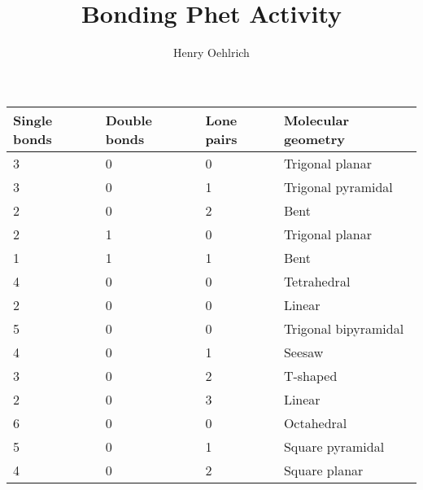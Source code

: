 \documentclass{article}
\title{Bonding Phet Activity}
\author{Henry Oehlrich}
\begin{document}
\maketitle

\begin{tabular}{l|l|l|l}
    \toprule
    Single bonds & Double bonds & Lone pairs & Molecular geometry \\
    \midrule
    3 & 0 & 0 & Trigonal planar \\
    3 & 0 & 1 & Trigonal pyramidal \\
    2 & 0 & 2 & Bent \\
    2 & 1 & 0 & Trigonal planar\\
    1 & 1 & 1 & Bent \\
    4 & 0 & 0 & Tetrahedral \\
    2 & 0 & 0 & Linear \\
    5 & 0 & 0 & Trigonal bipyramidal \\
    4 & 0 & 1 & Seesaw \\
    3 & 0 & 2 & T-shaped \\
    2 & 0 & 3 & Linear \\
    6 & 0 & 0 & Octahedral \\
    5 & 0 & 1 & Square pyramidal \\
    4 & 0 & 2 & Square planar \\
    
\end{tabular}
\end{document}
